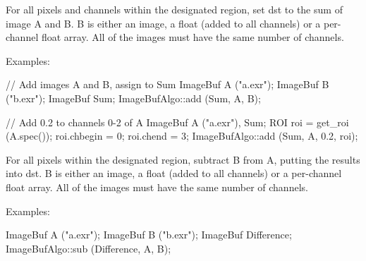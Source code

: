 For all pixels and channels within the designated region, set
{\cf dst} to the sum of image {\cf A} and {\cf B}.  {\cf B} is either an image,
a float (added to all channels) or a per-channel float array.
All of the images must have the same number of channels.

\smallskip
\noindent Examples:
\begin{code}
    // Add images A and B, assign to Sum
    ImageBuf A ("a.exr");
    ImageBuf B ("b.exr");
    ImageBuf Sum;
    ImageBufAlgo::add (Sum, A, B);

    // Add 0.2 to channels 0-2 of A
    ImageBuf A ("a.exr"), Sum;
    ROI roi = get_roi (A.spec());
    roi.chbegin = 0;  roi.chend = 3;
    ImageBufAlgo::add (Sum, A, 0.2, roi);
\end{code}
\apiend



 

For all pixels within the designated region, subtract {\cf B} from {\cf A},
putting the results into {\cf dst}. {\cf B} is either an image, a float
(added to all channels) or a per-channel float array. All of the images must
have the same number of channels.

\smallskip
\noindent Examples:
\begin{code}
    ImageBuf A ("a.exr");
    ImageBuf B ("b.exr");
    ImageBuf Difference;
    ImageBufAlgo::sub (Difference, A, B);
\end{code}
\apiend


 

